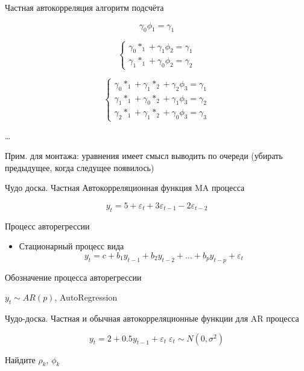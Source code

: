 \documentclass[ignorenonframetext,]{beamer}
\begin{document}
\begin{frame}{Частная автокорреляция алгоритм подсчёта}

\[
\gamma_0 \phi_1 = \gamma_1  
\]

\[
\begin{cases}
\gamma_0 *_1 + \gamma_1 \phi_2  = \gamma_1 \\
\gamma_1 *_1 + \gamma_0 \phi_2  = \gamma_2 
\end{cases}
\]

\[
\begin{cases}
\gamma_0 *_1 + \gamma_1 *_2 + \gamma_2 \phi_3 = \gamma_1 \\
\gamma_1 *_1 + \gamma_0 *_2 + \gamma_1 \phi_3 = \gamma_2 \\
\gamma_2 *_1 + \gamma_1 *_2 + \gamma_0 \phi_3 = \gamma_3
\end{cases}
\]

\ldots

Прим. для монтажа: уравнения имеет смысл выводить по очереди (убирать
предыдущее, когда следущее появилось)

\end{frame}

\begin{frame}{Чудо доска. Частная Автокорреляционная функция MA
процесса}

\[
y_t = 5 + \varepsilon_t + 3 \varepsilon_{t-1} -2\varepsilon_{t-2}
\]

\end{frame}

\begin{frame}{Процесс авторегрессии}

\begin{itemize}
\itemsep1pt\parskip0pt
\item
  Стационарный процесс вида \[
  y_t=c + b_1 y_{t-1} + b_2 y_{t-2} + \ldots + b_p y_{t-p} + \varepsilon_t
  \]
\end{itemize}

\end{frame}

\begin{frame}{Обозначение процесса авторегрессии}

$y_t \sim AR(p)$, AutoRegression

\end{frame}

\begin{frame}{Чудо-доска. Частная и обычная автокорреляционные функции
для AR процесса}

\[
y_t = 2 + 0.5 y_{t-1} + \varepsilon_t \; \varepsilon_t \sim N(0,\sigma^2)
\]

Найдите $\rho_k$, $\phi_k$

\end{frame}
\end{document}
